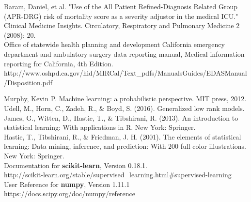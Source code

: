 \documentclass{article}
\begin{document}
\noindent
[2] Baram, Daniel, et al. "Use of the All Patient Refined-Diagnosis Related Group (APR-DRG) risk of mortality score as a severity adjustor in the medical ICU." Clinical Medicine Insights. Circulatory, Respiratory and Pulmonary Medicine 2 (2008): 20.\\

\noindent
[3] Office of statewide health planning and development California emergency department and ambulatory surgery data reporting manual, Medical information reporting for California, 4th Edition. \\
{\small {http://www.oshpd.ca.gov/hid/MIRCal/Text\_pdfs/ManualsGuides/EDASManual/Disposition.pdf}\\}

\noindent
[4] Murphy, Kevin P. Machine learning: a probabilistic perspective. MIT press, 2012.\\

\noindent
[5] Udell, M., Horn, C., Zadeh, R., \& Boyd, S. (2016). Generalized low rank models.\\

\noindent
[6] James, G., Witten, D., Hastie, T., \& Tibshirani, R. (2013). An introduction to statistical learning: With applications in R. New York: Springer.\\

\noindent
[7] Hastie, T., Tibshirani, R., \& Friedman, J. H. (2001). The elements of statistical learning: Data mining, inference, and prediction: With 200 full-color illustrations. New York: Springer.\\

\noindent
[8] Documentation for \textbf{scikit-learn}, Version 0.18.1.\\
{\small http://scikit-learn.org/stable/supervised\_learning.html\#supervised-learning}\\

\noindent
[9] User Reference for \textbf{numpy}, Version 1.11.1\\
{\small https://docs.scipy.org/doc/numpy/reference}
\end{document}
